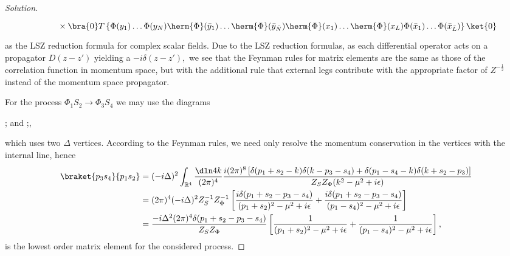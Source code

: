 \begin{proof}[Solution]
\begin{align*}
                                         &{}\phantom{\left(iZ_\Phi^{-\frac12}\right)}\times \bra{0}T\left\{\Phi(y_1) \dots \Phi(y_N) \herm{\Phi}(\bar{y}_1) \dots \herm{\Phi}(\bar{y}_{\bar{N}}) \herm{\Phi}(x_1) \dots \herm{\Phi}(x_L) \Phi(\bar{x}_1) \dots \Phi(\bar{x}_{\bar{L}})\right\}\ket{0}
   \end{align*}
   as the LSZ reduction formula for complex scalar fields. Due to the LSZ reduction formulas, as each differential operator acts on a propagator \(D(z - z')\) yielding a \(-i \delta(z - z'),\) we see that the Feynman rules for matrix elements are the same as those of the correlation function in momentum space, but with the additional rule that external legs contribute with the appropriate factor of \(Z^{-\frac12}\) instead of the momentum space propagator.

   For the process \(\Phi_1 S_2 \to \Phi_3 S_4\) we may use the diagrams
   \begin{center}
      ; 
      \quad and \quad
      ;,
   \end{center}
   which uses two \(\Delta\) vertices. According to the Feynman rules, we need only resolve the momentum conservation in the vertices with the internal line, hence
   \begin{align*}
      \braket{p_3 s_4}{p_1 s_2} &= (-i \Delta)^2 \int_{\mathbb{R}^4}\frac{\dln4k}{(2\pi)^4} \frac{i (2\pi)^8 \left[\delta(p_1 + s_2 - k)\delta(k - p_3 - s_4) + \delta(p_1 - s_4 - k)\delta(k + s_2 - p_3)\right]}{Z_S Z_\Phi (k^2 - \mu^2 + i \epsilon)}\\
      &= (2\pi)^4(-i \Delta)^2 Z_S^{-1} Z_\Phi^{-1} \left[\frac{i \delta(p_1 + s_2 - p_3 - s_4)}{(p_1 + s_2)^2 - \mu^2 + i \epsilon} + \frac{i \delta(p_1 + s_2 - p_3 - s_4)}{(p_1 - s_4)^2 - \mu^2 + i \epsilon}\right]\\
                                &= \frac{-i \Delta^2 (2\pi)^4 \delta(p_1 + s_2 - p_3 - s_4)}{Z_S Z_\Phi}\left[\frac{1}{(p_1 + s_2)^2 - \mu^2 + i \epsilon} + \frac{1}{(p_1 - s_4)^2 - \mu^2 + i \epsilon}\right],
   \end{align*}
   is the lowest order matrix element for the considered process. 


\end{proof}
